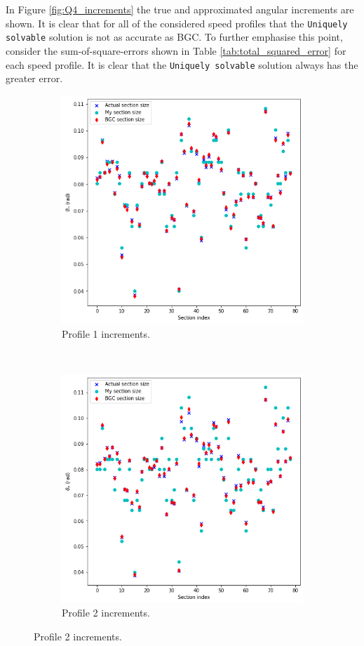 \documentclass{article}
\begin{document}
	In Figure \ref{fig:Q4_increments} the true and approximated angular increments are shown. It is clear that for all of the considered speed profiles that the \texttt{Uniquely solvable} solution is not as accurate as BGC. To further emphasise this point, consider the sum-of-square-errors shown in Table \ref{tab:total_squared_error} for each speed profile. It is clear that the \texttt{Uniquely solvable} solution always has the greater error.
	\begin{figure}[htb!]
		\centering
		\begin{subfigure}[b]{0.45\textwidth}
			\centering
			\includegraphics[width=\textwidth]{Q4_f1_4.png}
			\caption{Profile 1 increments.}
		\end{subfigure}
		~
		\begin{subfigure}[b]{0.45\textwidth}
			\centering
			\includegraphics[width=\textwidth]{Q4_f2_4.png}
			\caption{Profile 2 increments.}
		\end{subfigure}
		

\end{figure}
\end{document}
